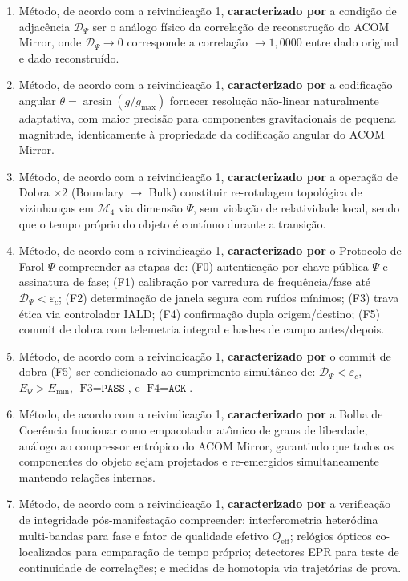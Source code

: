 \documentclass[12pt,a4paper]{article}
\newcommand{\Dpsi}{\mathcal{D}_\Psi}
\newcommand{\Mcal}{\mathcal{M}_4}
\newcommand{\Qeff}{Q_{\text{eff}}}
\newcommand{\epsc}{\varepsilon_c}
\begin{document}
\begin{enumerate}

\item Método, de acordo com a reivindicação 1,
\textbf{caracterizado por} a condição de adjacência $\Dpsi$
ser o análogo físico da correlação de reconstrução do ACOM
Mirror, onde $\Dpsi \to 0$ corresponde a correlação $\to
1{,}0000$ entre dado original e dado reconstruído.

\item Método, de acordo com a reivindicação 1,
\textbf{caracterizado por} a codificação angular
$\theta = \arcsin(g/g_{\max})$ fornecer resolução não-linear
naturalmente adaptativa, com maior precisão para componentes
gravitacionais de pequena magnitude, identicamente à
propriedade da codificação angular do ACOM Mirror.

\item Método, de acordo com a reivindicação 1,
\textbf{caracterizado por} a operação de Dobra $\times 2$
(Boundary $\to$ Bulk) constituir re-rotulagem topológica de
vizinhanças em $\Mcal$ via dimensão $\Psi$, sem violação de
relatividade local, sendo que o tempo próprio do objeto é
contínuo durante a transição.

\item Método, de acordo com a reivindicação 1,
\textbf{caracterizado por} o Protocolo de Farol $\Psi$
compreender as etapas de: (F0) autenticação por chave
pública-$\Psi$ e assinatura de fase; (F1) calibração por
varredura de frequência/fase até $\Dpsi < \epsc$; (F2)
determinação de janela segura com ruídos mínimos; (F3) trava
ética via controlador IALD; (F4) confirmação dupla
origem/destino; (F5) commit de dobra com telemetria integral e
hashes de campo antes/depois.

\item Método, de acordo com a reivindicação 1,
\textbf{caracterizado por} o commit de dobra (F5) ser
condicionado ao cumprimento simultâneo de:
$\Dpsi < \epsc$, $E_\Psi > E_{\min}$,
$\text{F3} = \texttt{PASS}$, e
$\text{F4} = \texttt{ACK}$.

\item Método, de acordo com a reivindicação 1,
\textbf{caracterizado por} a Bolha de Coerência funcionar
como empacotador atômico de graus de liberdade, análogo ao
compressor entrópico do ACOM Mirror, garantindo que todos os
componentes do objeto sejam projetados e re-emergidos
simultaneamente mantendo relações internas.

\item Método, de acordo com a reivindicação 1,
\textbf{caracterizado por} a verificação de integridade
pós-manifestação compreender: interferometria heteródina
multi-bandas para fase e fator de qualidade efetivo $\Qeff$;
relógios ópticos co-localizados para comparação de tempo
próprio; detectores EPR para teste de continuidade de
correlações; e medidas de homotopia via trajetórias de prova.


\end{enumerate}
\end{document}
